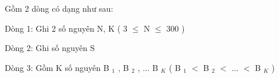 Gồm 2 dòng có dạng như sau:

Dòng 1: Ghi 2 số nguyên N, K ( 3  $\le$  N  $\le$  300 )

Dòng 2: Ghi số nguyên S

Dòng 3: Gồm K số nguyên B $_ 1 $ , B $_ 2 $ , ... B $_ K $ ( B $_ 1 $ $<$ B $_ 2 $ $<$ ... $<$ B $_ K $ )

\